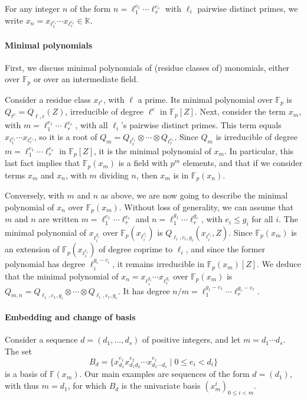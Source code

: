 \documentclass{sig-alternate}
\def\F {\ensuremath{\mathbb{F}}}
\def\K {\ensuremath{\mathbb{K}}}
\begin{document}
For any integer $n$ of the form $n=\ell_1^{c_1}\cdots \ell_s^{c_s}$
with $\ell_i$ pairwise distinct primes, we write $x_n =
x_{\ell_1^{c_1}} \cdots x_{\ell_s^{c_s}} \in \K$.

\paragraph*{{\bf \rm Minimal polynomials}}
First, we discuss minimal polynomials of (residue classes of)
monomials, either over $\F_p$ or over an intermediate field.

Consider a residue class $x_{\ell^{c}}$, with $\ell$ a prime. Its
minimal polynomial over $\F_p$ is $Q_{\ell^c}=Q_{\ell,c}(Z)$,
irreducible of degree $\ell^{c}$ in $\F_p[Z]$. Next, consider the term
$x_m$, with $m=\ell_1^{e_1}\cdots \ell_r^{e_r}$, with all $\ell_i$'s
pairwise distinct primes. This term equals $x_{\ell_1^{e_1}} \cdots
x_{\ell_r^{e_r}}$, so it is a root of $Q_{m}=Q_{\ell_1^{e_1}} \otimes
\cdots \otimes Q_{\ell_r^{e_r}}.$ Since $Q_m$ is irreducible of degree
$m=\ell_1^{e_1}\cdots \ell_r^{e_r}$ in $\F_p[Z]$, it is the minimal
polynomial of $x_m$.  In particular, this last fact implies that
$\F_p(x_m)$ is a field with $p^m$ elements, and that if we consider
terms $x_m$ and $x_n$, with $m$ dividing $n$, then $x_m$ is in
$\F_p(x_n)$.

Conversely, with $m$ and $n$ as above, we are now going to describe
the minimal polynomial of $x_n$ over $\F_p(x_m)$. Without loss of
generality, we can assume that $m$ and $n$ are written
$m=\ell_1^{e_1}\cdots \ell_r^{e_r}$ and
$n=\ell_1^{g_1}\cdots\ell_r^{g_r}$, with $e_i \le g_i$ for all $i$.
The minimal polynomial of $x_{\ell_i^{g_i}}$ over
$\F_p(x_{\ell_i^{c_i}})$ is $Q_{\ell_i,c_i,g_i}(x_{\ell_i^{c_i}},Z)$.
Since $\F_p(x_m)$ is an extension of $\F_p(x_{\ell_i^{c_i}})$ of
degree coprime to $\ell_i$, and since the former polynomial has degree
$\ell_i^{g_i-c_i}$, it remains irreducible in $\F_p(x_m)[Z]$. We
deduce that the minimal polynomial of $x_n = x_{\ell_1^{g_1}}\cdots
x_{\ell_r^{g_r}}$ over $\F_p(x_m)$ is $Q_{m,n}=Q_{\ell_1,c_1,g_i}
\otimes \cdots \otimes Q_{\ell_r,c_r,g_r}.$ It has degree
$n/m=\ell_1^{g_1-c_1}\cdots \ell_r^{g_r-c_r}$.

\paragraph*{\bf \rm {Embedding and change of basis}}
Consider a sequence $d=(d_1,\dots,d_s)$ of positive integers, and let
$m=d_1 \cdots d_s$. The set
$$B_d = \{ x_{d_1}^{e_1} x_{d_1 d_2}^{e_2} \cdots x_{d_1 \cdots
  d_s}^{e_1} \mid 0 \le e_i < d_i \}$$ is a basis of $\F(x_m)$. Our
main examples are sequences of the form $d=(d_1)$, with thus $m=d_1$,
for which $B_d$ is the univariate basis $(x_m^i)_{0 \le i < m}$.
\end{document}
